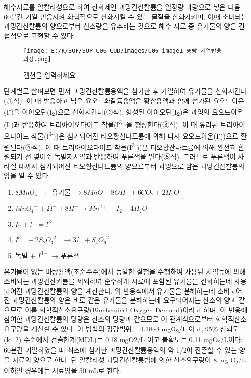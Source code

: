 \documentclass[
]{book}
\providecommand{\tightlist}{%
  \setlength{\itemsep}{0pt}\setlength{\parskip}{0pt}}
\begin{document}
해수시료를 알칼리성으로 하여 산화제인 과망간산칼륨을 일정량 과량으로 넣은 다음 60분간 가열 반응시켜 화학적으로 산화시킬 수 있는 물질을 산화시키며, 이때 소비되는 과망간산칼륨의 양으로부터 산소량을 유추하는 것으로 해수 시료 중 유기물의 양을 간접적으로 표현할 수 있다.

\begin{figure}
\centering
\texttt{[image: E:/R/SOP/SOP\_C06\_COD/images/C06\_image1\_중탕 가열반응 과정.png]}
\caption{캡션을 입력하세요}
\end{figure}

단계별로 살펴보면 먼저 과망간산칼륨용액을 첨가한 후 가열하여 유기물을 산화시킨다(①식). 이 때 반응하고 남은 요오드화칼륨용액은 황산용액과 함께 첨가된 요오드이온(I\textsuperscript{-})을 아이오딘(I\textsubscript{2})으로 산화시킨다(②식). 형성된 아이오딘(I\textsubscript{2})은 과잉의 요오드이온(I\textsuperscript{-})과 반응하여 트리아이오다이드 착물(I\textsuperscript{3-})을 형성한다(③식). 이 때 유리된 트리아이오다이드 착물(I\textsuperscript{3-}))은 첨가되어진 티오황산나트륨에 의해 다시 요오드이온(I\textsuperscript{-}))으로 환원된다(④식). 이 때 트리아이오다이드 착물(I\textsuperscript{3-}))은 티오황산나트륨에 의해 완전히 환원되기 전 넣어준 녹말지시약과 반응하여 푸른색을 띈다(⑤식). 그러므로 푸른색이 사라질 때까지 첨가되어진 티오황산나트륨의 양으로부터 과잉으로 남은 과망간산칼륨의 양을 알 수 있다.

\begin{enumerate}
\def\labelenumi{(\arabic{enumi})}
\tightlist
\item
  \(8{MnO_{4}}^{-} +\) 유기물 \(→ 8MnO +8OH^{-} + 6CO_{2} +2H_{2}O\)\\
\item
  \({MnO_{4}}^{-} + 2I^{-} + 8H^{+} → Mn^{2+} + I_{2} + 4H_{2}O\)\\
\item
  \(I_{2} +I^{-} = I^{3-}\)\\
\item
  \(I^{3-} +2{S_{2}O_{3}}^{2-} → 3I^{-} +{S_{4}O_{6}}^{2-}\)\\
\item
  녹말 + \(I^{3-}\) → 푸른색
\end{enumerate}

유기물이 없는 바탕용액(초순수수)에서 동일한 실험을 수행하여 사용된 시약등에 의해 소비되는 과망간산카륨을 제외하여 순수하게 시료에 포함된 유기물을 산화하는데 사용되어진 과망간산칼륨의 양을 계산한다. 위 반응식에서 유기물을 분해하는데 소비되어진 과망간산칼륨의 양은 바로 같은 유기물을 분해하는데 요구되어지는 산소의 양과 같으므로 이를 화학적산소요구량(Biochemical Oxygen Demand)이라고 하며, 이 반응에 참여한 과망간산칼륨의 당량은 산소의 당량과 같으므로 이 관계식으로부터 화학적산소요구량을 계산할 수 있다.
이 방법의 정량범위는 0.18\textasciitilde8 mgO\textsubscript{2}/L 이고, 95\% 신뢰도(k=2) 수준에서 검출한계(MDL)는 0.18 mgO2/L 이고 불확도는 0.11 mgO\textsubscript{2}/L이다. 60분간 가열하였을 때 최초에 첨가한 과망간산칼륨용액의 약 1/2이 잔존할 수 있는 양을 시료의 양으로 한다. 단 알칼리성 과망간산칼륨법에 의한 산소요구량이 8 mg O\textsubscript{2}/L 이하인 경우에는 시료양을 50 mL로 한다.
\end{document}
